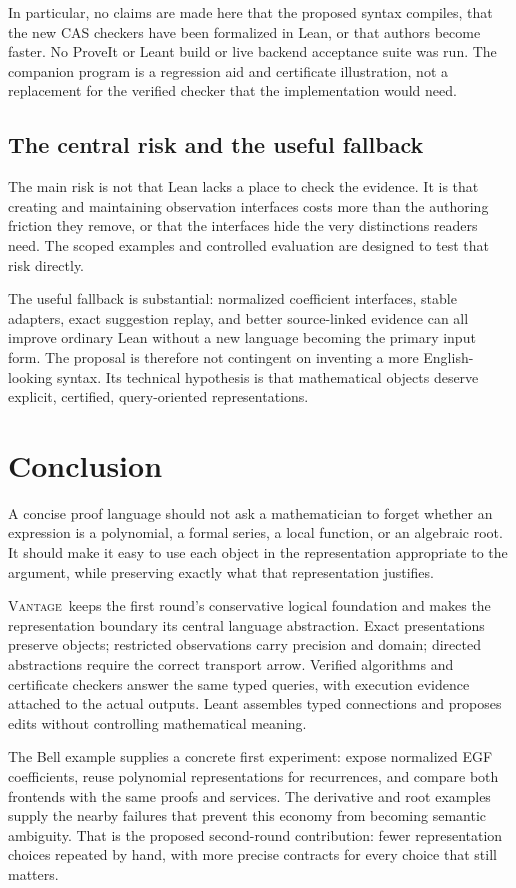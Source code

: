 \documentclass[11pt,a4paper]{article}
\newcommand{\Vantage}{\textsc{Vantage}}
\theoremstyle{definition}
\begin{document}
In particular, no claims are made here that the proposed syntax compiles, that
the new CAS checkers have been formalized in Lean, or that authors become faster.
No ProveIt or Leant build or live backend acceptance suite was run. The companion
program is a regression aid and certificate illustration, not a replacement for
the verified checker that the implementation would need.

\subsection{The central risk and the useful fallback}
The main risk is not that Lean lacks a place to check the evidence. It is that
creating and maintaining observation interfaces costs more than the authoring
friction they remove, or that the interfaces hide the very distinctions readers
need. The scoped examples and controlled evaluation are designed to test that
risk directly.

The useful fallback is substantial: normalized coefficient interfaces, stable
adapters, exact suggestion replay, and better source-linked evidence can all
improve ordinary Lean without a new language becoming the primary input form.
The proposal is therefore not contingent on inventing a more English-looking
syntax. Its technical hypothesis is that mathematical objects deserve explicit,
certified, query-oriented representations.

\section{Conclusion}
A concise proof language should not ask a mathematician to forget whether an
expression is a polynomial, a formal series, a local function, or an algebraic
root. It should make it easy to use each object in the representation appropriate
to the argument, while preserving exactly what that representation justifies.

\Vantage\ keeps the first round's conservative logical foundation and makes the
representation boundary its central language abstraction. Exact presentations
preserve objects; restricted observations carry precision and domain; directed
abstractions require the correct transport arrow. Verified algorithms and
certificate checkers answer the same typed queries, with execution evidence
attached to the actual outputs. Leant assembles typed connections and proposes
edits without controlling mathematical meaning.

The Bell example supplies a concrete first experiment: expose normalized EGF
coefficients, reuse polynomial representations for recurrences, and compare both
frontends with the same proofs and services. The derivative and root examples
supply the nearby failures that prevent this economy from becoming semantic
ambiguity. That is the proposed second-round contribution: fewer representation
choices repeated by hand, with more precise contracts for every choice that
still matters.
\end{document}

